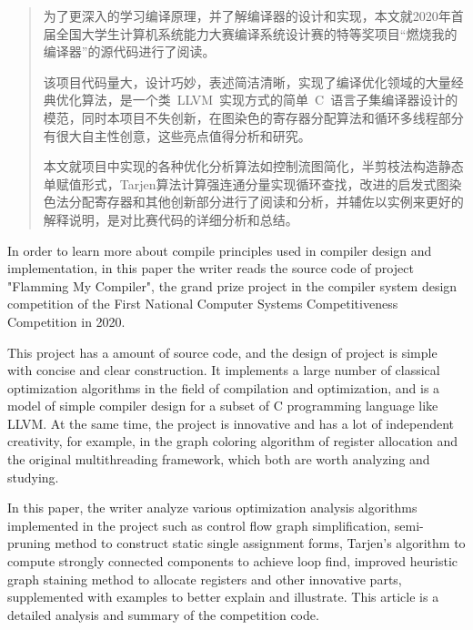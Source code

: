 

\begin{abstract}
 为了更深入的学习编译原理，并了解编译器的设计和实现，本文就2020年首届全国大学生计算机系统能力大赛编译系统设计赛的特等奖项目“燃烧我的编译器”的源代码进行了阅读。
 
 该项目代码量大，设计巧妙，表述简洁清晰，实现了编译优化领域的大量经典优化算法，是一个类\ LLVM\ 实现方式的简单\ C\ 语言子集编译器设计的模范，同时本项目不失创新，在图染色的寄存器分配算法和循环多线程部分有很大自主性创意，这些亮点值得分析和研究。

本文就项目中实现的各种优化分析算法如控制流图简化，半剪枝法构造静态单赋值形式，Tarjen算法计算强连通分量实现循环查找，改进的启发式图染色法分配寄存器和其他创新部分进行了阅读和分析，并辅佐以实例来更好的解释说明，是对比赛代码的详细分析和总结。

\end{abstract}

\begin{abstract*}

In order to learn more about compile principles used in compiler design and implementation, in this paper the writer reads the source code of project "Flamming My Compiler", the grand prize project in the compiler system design competition of the First National Computer Systems Competitiveness Competition in 2020.
 
 This project has a amount of source code, and the design of project is simple with concise and clear construction. It implements a large number of classical optimization algorithms in the field of compilation and optimization, and is a model of simple compiler design for a subset of C programming language like LLVM. At the same time, the project is innovative and has a lot of independent creativity, for example, in the graph coloring algorithm of register allocation and the original multithreading framework, which both are worth analyzing and studying.

In this paper, the writer analyze various optimization analysis algorithms implemented in the project such as control flow graph simplification, semi-pruning method to construct static single assignment forms, Tarjen's algorithm to compute strongly connected components to achieve loop find, improved heuristic graph staining method to allocate registers and other innovative parts, supplemented with examples to better explain and illustrate. This article is a detailed analysis and summary of the competition code.

\end{abstract*}
